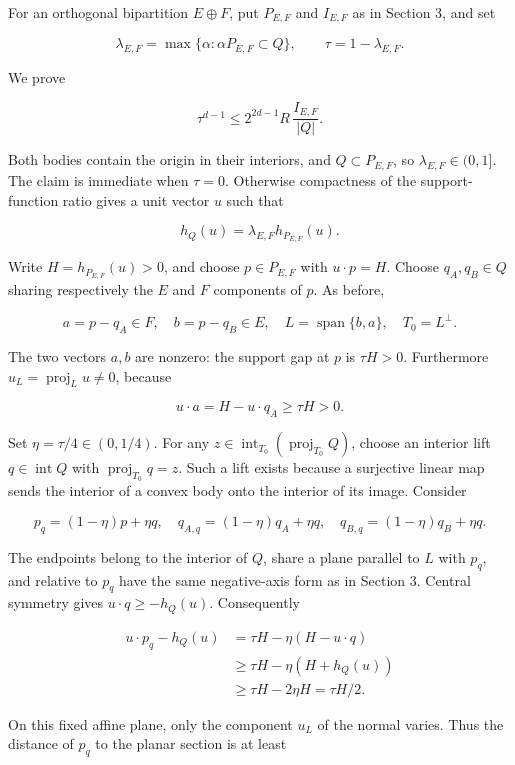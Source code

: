 \documentclass[
  11pt,
]{article}
\begin{document}
For an orthogonal bipartition \(E\oplus F\), put \(P_{E,F}\) and
\(I_{E,F}\) as in Section 3, and set

\[
\lambda_{E,F}=\max\{\alpha:\alpha P_{E,F}\subset Q\},
\qquad \tau=1-\lambda_{E,F}.
\]

We prove

\[
\boxed{\tau^{d-1}\le
       2^{2d-1}R\,\frac{I_{E,F}}{|Q|}.}                \tag{6.4}
\]

Both bodies contain the origin in their interiors, and \(Q\subset
P_{E,F}\), so \(\lambda_{E,F}\in(0,1]\). The claim is immediate when
\(\tau=0\). Otherwise compactness of the support-function ratio gives a
unit vector \(u\) such that

\[
h_Q(u)=\lambda_{E,F}h_{P_{E,F}}(u).
\]

Write \(H=h_{P_{E,F}}(u)>0\), and choose \(p\in P_{E,F}\) with
\(u\cdot p=H\). Choose \(q_A,q_B\in Q\) sharing respectively the \(E\)
and \(F\) components of \(p\). As before,

\[
a=p-q_A\in F,\quad b=p-q_B\in E,\quad
L=\operatorname{span}\{b,a\},\quad T_0=L^\perp.
\]

The two vectors \(a,b\) are nonzero: the support gap at \(p\) is
\(\tau H>0\). Furthermore \(u_L=\operatorname{proj}_L u\ne0\), because

\[
u\cdot a=H-u\cdot q_A\ge\tau H>0.
\]

Set \(\eta=\tau/4\in(0,1/4)\). For any
\(z\in\operatorname{int}_{T_0}(\operatorname{proj}_{T_0}Q)\), choose an
interior lift \(q\in\operatorname{int}Q\) with
\(\operatorname{proj}_{T_0}q=z\). Such a lift exists because a
surjective linear map sends the interior of a convex body onto the
interior of its image. Consider

\[
p_q=(1-\eta)p+\eta q,\quad
q_{A,q}=(1-\eta)q_A+\eta q,\quad
q_{B,q}=(1-\eta)q_B+\eta q.
\]

The endpoints belong to the interior of \(Q\), share a plane parallel to
\(L\) with \(p_q\), and relative to \(p_q\) have the same negative-axis
form as in Section 3. Central symmetry gives \(u\cdot q\ge-h_Q(u)\).
Consequently

\[
\begin{aligned}
u\cdot p_q-h_Q(u)
 &=\tau H-\eta(H-u\cdot q)\\
 &\ge\tau H-\eta(H+h_Q(u))\\
 &\ge\tau H-2\eta H=\tau H/2.
\end{aligned}
\]

On this fixed affine plane, only the component \(u_L\) of the normal
varies. Thus the distance of \(p_q\) to the planar section is at least
\end{document}
